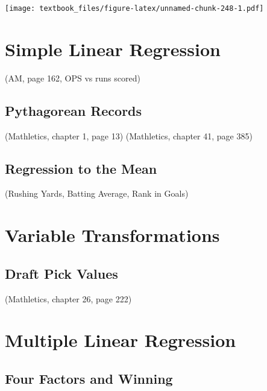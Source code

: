\documentclass[
  11pt,
]{book}
\theoremstyle{definition}
\theoremstyle{definition}
\theoremstyle{definition}
\theoremstyle{definition}
\theoremstyle{remark}
\begin{document}
\texttt{[image: textbook\_files/figure-latex/unnamed-chunk-248-1.pdf]}

\newpage

\hypertarget{simple-linear-regression}{%
\section{Simple Linear Regression}\label{simple-linear-regression}}

(AM, page 162, OPS vs runs scored)

\hypertarget{pythagorean-records}{%
\subsection{Pythagorean Records}\label{pythagorean-records}}

(Mathletics, chapter 1, page 13)
(Mathletics, chapter 41, page 385)

\hypertarget{regression-to-the-mean}{%
\subsection{Regression to the Mean}\label{regression-to-the-mean}}

(Rushing Yards, Batting Average, Rank in Goals)

\hypertarget{variable-transformations}{%
\section{Variable Transformations}\label{variable-transformations}}

\hypertarget{draft-pick-values}{%
\subsection{Draft Pick Values}\label{draft-pick-values}}

(Mathletics, chapter 26, page 222)

\hypertarget{multiple-linear-regression}{%
\section{Multiple Linear Regression}\label{multiple-linear-regression}}

\hypertarget{four-factors-and-winning}{%
\subsection{Four Factors and Winning}\label{four-factors-and-winning}}
\end{document}
